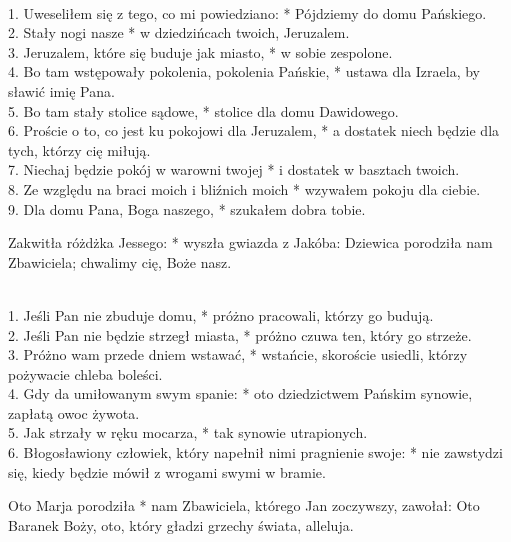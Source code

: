 \\
1. Uweseliłem się z tego, co mi powiedziano: * Pójdziemy do domu Pańskiego.\\
2. Stały nogi nasze * w dziedzińcach twoich, Jeruzalem.\\
3. Jeruzalem, które się buduje jak miasto, * w sobie zespolone.\\
4. Bo tam wstępowały pokolenia, pokolenia Pańskie, * ustawa dla Izraela, by sławić imię Pana.\\
5. Bo tam stały stolice sądowe, * stolice dla domu Dawidowego.\\
6. Proście o to, co jest ku pokojowi dla Jeruzalem, * a dostatek niech będzie dla tych, którzy cię miłują.\\
7. Niechaj będzie pokój w warowni twojej * i dostatek w basztach twoich.\\
8. Ze względu na braci moich i bliźnich moich * wzywałem pokoju dla ciebie.\\
9. Dla domu Pana, Boga naszego, * szukałem dobra tobie.

 Zakwitła różdżka Jessego: * wyszła gwiazda z Jakóba: Dziewica porodziła nam Zbawiciela; chwalimy cię, Boże nasz.

\\
1. Jeśli Pan nie zbuduje domu, * próżno pracowali, którzy go budują.\\
2. Jeśli Pan nie będzie strzegł miasta, * próżno czuwa ten, który go strzeże.\\
3. Próżno wam przede dniem wstawać, * wstańcie, skoroście usiedli, którzy pożywacie chleba boleści.\\
4. Gdy da umiłowanym swym spanie: * oto dziedzictwem Pańskim synowie, zapłatą owoc żywota.\\
5. Jak strzały w ręku mocarza, * tak synowie utrapionych.\\
6. Błogosławiony człowiek, który napełnił nimi pragnienie swoje: * nie zawstydzi się, kiedy będzie mówił z wrogami swymi w bramie.

 Oto Marja porodziła * nam Zbawiciela, którego Jan zoczywszy, zawołał: Oto Baranek Boży, oto, który gładzi grzechy świata, alleluja.


